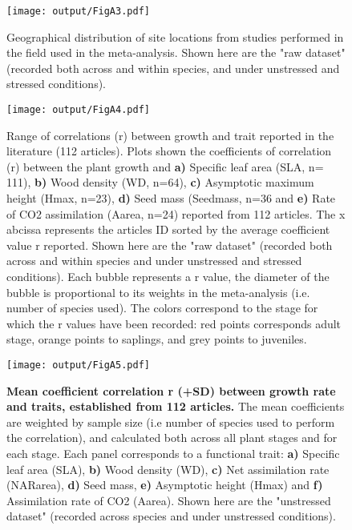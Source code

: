 \documentclass[a4paper]{article}\usepackage[]{graphicx}\usepackage[]{color}
\begin{document}
\begin{appendices}
\begin{figure}[htbp]
\centering
\texttt{[image: output/FigA3.pdf]}
\caption{Geographical distribution of site locations from studies performed in the field used in the meta-analysis. Shown here are the "raw dataset" (recorded both across and within species, and under unstressed and stressed conditions).}
\label{FigA3}
\end{figure}


\begin{figure}[htbp]
\centering
\texttt{[image: output/FigA4.pdf]}
\caption{Range of correlations (r) between
growth and trait reported in the literature (112 articles). Plots shown the coefficients of correlation (r)
between the plant growth and \textbf{a)} Specific leaf area (SLA, n=
111), \textbf{b)} Wood density (WD, n=64), \textbf{c)} Asymptotic
maximum height (Hmax, n=23), \textbf{d)} Seed mass (Seedmass, n=36 and
\textbf{e)} Rate of CO2 assimilation (Aarea, n=24) reported from 112
articles. The x abcissa represents the articles ID sorted by the average coefficient value r reported.
Shown here are the "raw dataset" (recorded both across and within species
and under unstressed and stressed conditions). Each bubble represents a r value, the diameter of the bubble
is proportional to its weights in the meta-analysis (i.e. number of species used). The colors
correspond to the stage for which the r values have been recorded: red
points corresponds adult stage, orange points to saplings, and grey
points to juveniles.}
\label{FigA4}
\end{figure}


\begin{figure}[htbp]
\centering
\texttt{[image: output/FigA5.pdf]}
\caption{\textbf{Mean coefficient correlation r (+SD) between growth rate and traits, established from 112 articles.} The mean coefficients are weighted by sample size (i.e number of species used to perform the correlation), and calculated both across all plant stages and for each stage. Each panel corresponds to a functional trait: \textbf{a)} Specific leaf area (SLA), \textbf{b)} Wood density (WD), \textbf{c)} Net assimilation rate (NARarea), \textbf{d)} Seed mass, \textbf{e)} Asymptotic height (Hmax) and \textbf{f)} Assimilation rate of CO2 (Aarea). Shown here are the "unstressed dataset" (recorded across species and under unstressed conditions).}
\label{FigA5}
\end{figure}


\end{appendices}
\end{document}
